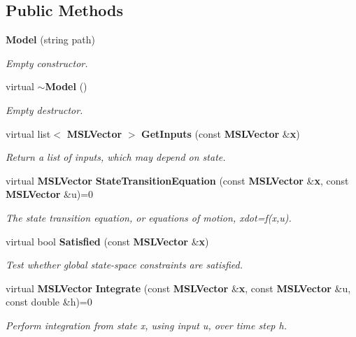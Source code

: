 \subsection*{Public Methods}
\begin{CompactItemize}
\item 
{\bf Model} (string path)
\begin{CompactList}\small\item\em Empty constructor.\item\end{CompactList}\item 
virtual {\bf $\sim$Model} ()
\begin{CompactList}\small\item\em Empty destructor.\item\end{CompactList}\item 
virtual list$<$ {\bf MSLVector} $>$ {\bf Get\-Inputs} (const {\bf MSLVector} \&{\bf x})
\begin{CompactList}\small\item\em Return a list of inputs, which may depend on state.\item\end{CompactList}\item 
virtual {\bf MSLVector} {\bf State\-Transition\-Equation} (const {\bf MSLVector} \&{\bf x}, const {\bf MSLVector} \&u)=0
\begin{CompactList}\small\item\em The state transition equation, or equations of motion, xdot=f(x,u).\item\end{CompactList}\item 
virtual bool {\bf Satisfied} (const {\bf MSLVector} \&{\bf x})
\begin{CompactList}\small\item\em Test whether global state-space constraints are satisfied.\item\end{CompactList}\item 
virtual {\bf MSLVector} {\bf Integrate} (const {\bf MSLVector} \&{\bf x}, const {\bf MSLVector} \&u, const double \&h)=0
\begin{CompactList}\small\item\em Perform integration from state x, using input u, over time step h.\item\end{CompactList}\item 

\end{CompactItemize}
